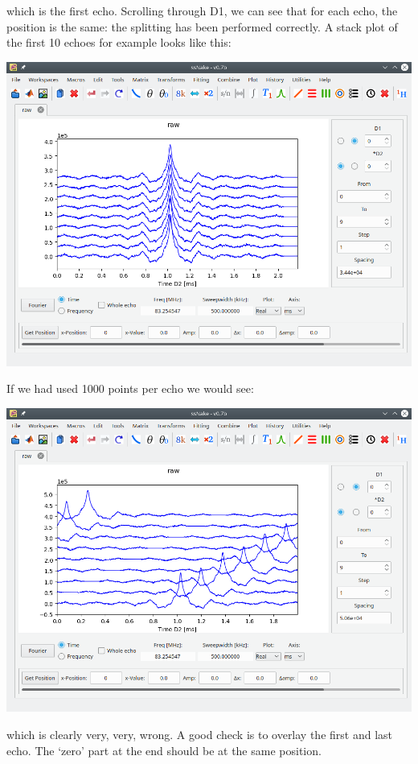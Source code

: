 \documentclass[11pt,a4paper]{article}
\begin{document}
which is the first echo.
Scrolling through D1, we can see that for each echo, the position is the same: the splitting has been performed correctly.
A stack plot of the first 10 echoes for example looks like this:
\begin{center}
\includegraphics[width=0.7\linewidth]{Figs/Fig3.png}
\end{center}
If we had used 1000 points per echo we would see:
\begin{center}
\includegraphics[width=0.7\linewidth]{Figs/Fig4.png}
\end{center}
which is clearly very, very, wrong.
A good check is to overlay the first and last echo. The `zero' part at the end should be at the same position.
\end{document}
